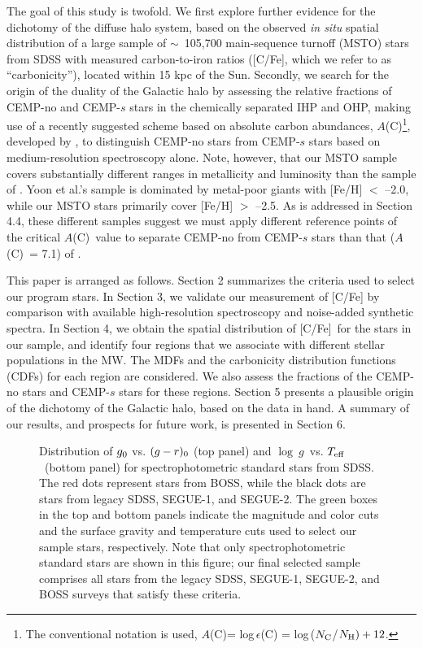 \documentclass[iop]{emulateapj}
\newcommand*{\ac}{$A$(C)}
\newcommand*{\teff}{$T_{\rm eff}$}
\newcommand*{\logg}{$\log~g$}
\newcommand*{\cfe}{[C/Fe]}
\begin{document}
The goal of this study is twofold. We first explore further evidence
for the dichotomy of the diffuse halo system, based on the observed {\it
in situ} spatial distribution of a large sample of $\sim$~105,700
main-sequence turnoff (MSTO) stars from SDSS with measured
carbon-to-iron ratios ([C/Fe], which we refer to as ``carbonicity''),
located within 15 kpc of the Sun. Secondly, we search for the origin of
the duality of the Galactic halo by assessing the relative fractions of
CEMP-no and CEMP-$s$ stars in the chemically separated IHP and OHP,
making use of a recently suggested scheme based on absolute carbon
abundances, $A$(C)\footnote[9]{The conventional notation is used,
\ac = log\,$\epsilon$(C) = log\,($N_{\rm C}$/$N_{\rm H}) + 12$.}, developed
by \citet{yoon2016}, to distinguish CEMP-no stars from CEMP-$s$ stars
based on medium-resolution spectroscopy alone. Note, however, 
that our MSTO sample covers substantially different ranges
in metallicity and luminosity than the sample of \citet{yoon2016}. 
Yoon et al.'s sample is dominated by metal-poor giants with 
[Fe/H] $<$ --2.0, while our MSTO stars primarily cover [Fe/H] $>$ --2.5. 
As is addressed in Section 4.4, these different samples suggest 
we must apply different reference 
points of the critical \ac\ value to separate CEMP-no from CEMP-$s$ stars than 
that (\ac\ = 7.1) of \citet{yoon2016}.

This paper is arranged as follows. Section 2 summarizes the criteria
used to select our program stars. In Section 3, we validate our
measurement of [C/Fe] by comparison with available high-resolution
spectroscopy and noise-added synthetic spectra. In Section 4, we obtain
the spatial distribution of \cfe\ for the stars in our sample, and identify four
regions that we associate with different stellar populations in the MW. The
MDFs and the carbonicity distribution functions (CDFs) for each region
are considered. We also assess the fractions of the CEMP-no stars and
CEMP-$s$ stars for these regions. Section 5 presents a plausible origin
of the dichotomy of the Galactic halo, based on the data in hand.
A summary of our results, and prospects for future work, is presented in
Section 6.

\begin{figure}[t]
\centering
{}
\caption{Distribution of $g_{\rm 0}$ vs. $(g-r)_{\rm 0}$ (top panel)
and \logg\ vs. \teff\ (bottom panel) for
spectrophotometric standard stars from SDSS. The red dots represent
stars from BOSS, while the black dots are stars from legacy SDSS,
SEGUE-1, and SEGUE-2. The green boxes in the top and bottom panels
indicate the magnitude and color cuts and the surface gravity and
temperature cuts used to select our sample stars, respectively. Note
that only spectrophotometric standard stars are shown in this figure;
our final selected sample comprises all stars from the legacy SDSS,
SEGUE-1, SEGUE-2, and BOSS surveys that satisfy these criteria.}
\label{fig:sample}
\end{figure}
\end{document}
